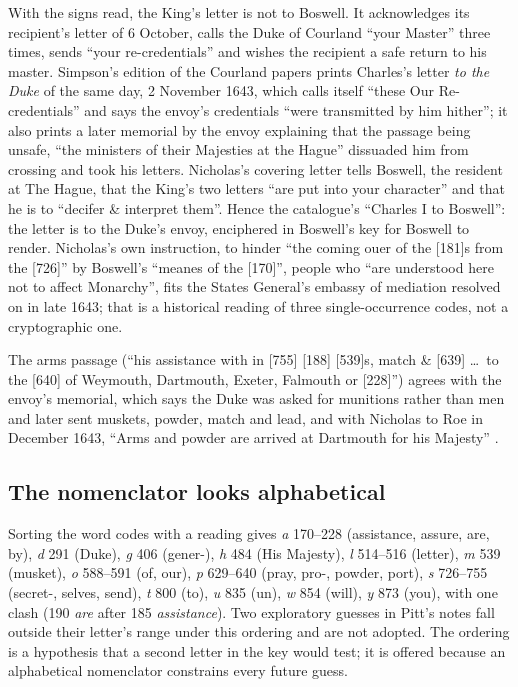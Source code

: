 \documentclass[11pt]{article}
\begin{document}
With the signs read, the King's letter is not to Boswell. It acknowledges its recipient's letter of 6 October, calls the Duke of Courland ``your Master'' three times, sends ``your re-credentials'' and wishes the recipient a safe return to his master. Simpson's edition of the Courland papers \cite{Simpson:1893} prints Charles's letter \emph{to the Duke} of the same day, 2 November 1643, which calls itself ``these Our Re-credentials'' and says the envoy's credentials ``were transmitted by him hither''; it also prints a later memorial by the envoy explaining that the passage being unsafe, ``the ministers of their Majesties at the Hague'' dissuaded him from crossing and took his letters. Nicholas's covering letter tells Boswell, the resident at The Hague, that the King's two letters ``are put into your character'' and that he is to ``decifer \& interpret them''. Hence the catalogue's ``Charles I to Boswell'': the letter is to the Duke's envoy, enciphered in Boswell's key for Boswell to render. Nicholas's own instruction, to hinder ``the coming ouer of the [181]s from the [726]'' by Boswell's ``meanes of the [170]'', people who ``are understood here not to affect Monarchy'', fits the States General's embassy of mediation resolved on in late 1643; that is a historical reading of three single-occurrence codes, not a cryptographic one.

The arms passage (``his assistance with in [755] [188] [539]s, match \& [639] \ldots\ to the [640] of Weymouth, Dartmouth, Exeter, Falmouth or [228]'') agrees with the envoy's memorial, which says the Duke was asked for munitions rather than men and later sent muskets, powder, match and lead, and with Nicholas to Roe in December 1643, ``Arms and powder are arrived at Dartmouth for his Majesty'' \cite{CSPD:1641}.

\subsection{The nomenclator looks alphabetical}

Sorting the word codes with a reading gives \emph{a} 170--228 (assistance, assure, are, by), \emph{d} 291 (Duke), \emph{g} 406 (gener-), \emph{h} 484 (His Majesty), \emph{l} 514--516 (letter), \emph{m} 539 (musket), \emph{o} 588--591 (of, our), \emph{p} 629--640 (pray, pro-, powder, port), \emph{s} 726--755 (secret-, selves, send), \emph{t} 800 (to), \emph{u} 835 (un), \emph{w} 854 (will), \emph{y} 873 (you), with one clash (190 \emph{are} after 185 \emph{assistance}). Two exploratory guesses in Pitt's notes fall outside their letter's range under this ordering and are not adopted. The ordering is a hypothesis that a second letter in the key would test; it is offered because an alphabetical nomenclator constrains every future guess.
\end{document}
